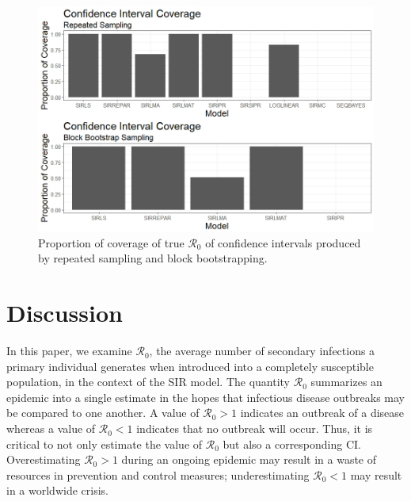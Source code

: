 \documentclass[12pt]{article}
\newcommand{\rr}{\ensuremath{\mathcal{R}_0}}
\begin{document}
\begin{figure}[H]
	\begin{center}
		\includegraphics[scale=0.5]{images/coverage.jpeg}
		\caption{Proportion of coverage of true $\rr$ of confidence intervals produced by repeated sampling and block bootstrapping.}
		\label{fig:coverage}	
	\end{center}
\end{figure}

\section{Discussion}\label{sec:discussion}



In this paper, we examine $\rr$, the average number of secondary infections a primary individual generates when introduced into a completely susceptible population, in the context of the SIR model.  The quantity $\rr$ summarizes an epidemic into a single estimate in the hopes that infectious disease outbreaks may be compared to one another.  A value of $\rr > 1$ indicates an outbreak of a disease whereas a value of $\rr < 1$ indicates that no outbreak will occur.  Thus, it is critical to not only estimate the value of $\rr$ but also a corresponding CI.  Overestimating $\rr > 1$ during an ongoing epidemic may result in a waste of resources in prevention and control measures; underestimating $\rr < 1$ may result in a worldwide crisis.
\end{document}
